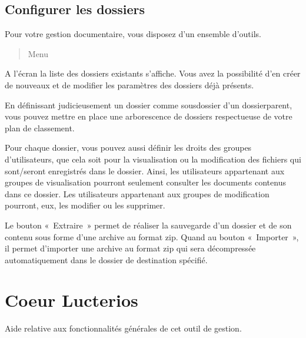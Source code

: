 \documentclass[a4paper,10pt,oneside,french]{sphinxmanual}
\begin{document}
\noindent{}

\sphinxstepscope


\section{Configurer les dossiers}
\label{\detokenize{documents/configuration:configurer-les-dossiers}}\label{\detokenize{documents/configuration::doc}}
\sphinxAtStartPar
Pour votre gestion documentaire, vous disposez d’un ensemble d’outils.
\begin{quote}

\sphinxAtStartPar
Menu 
\end{quote}

\sphinxAtStartPar
A l’écran la liste des dossiers existants s’affiche. Vous avez la possibilité d’en créer de nouveaux et de modifier les paramètres des dossiers déjà présents.

\noindent{}

\sphinxAtStartPar
En définissant judicieusement un dossier comme sous\sphinxhyphen{}dossier d’un dossier\sphinxhyphen{}parent, vous pouvez  mettre en place une arborescence de dossiers respectueuse de votre plan de classement.

\sphinxAtStartPar
Pour chaque dossier, vous pouvez aussi définir les droits des groupes d’utilisateurs, que cela soit pour la visualisation ou la modification des fichiers qui sont/seront enregistrés dans le dossier.
Ainsi, les utilisateurs appartenant aux groupes de visualisation pourront seulement consulter les documents contenus dans ce dossier. Les utilisateurs appartenant aux groupes de modification pourront, eux, les modifier ou les supprimer.

\sphinxAtStartPar
Le bouton « Extraire » permet de réaliser la sauvegarde d’un dossier et de son contenu sous forme d’une archive au format zip.
Quand au bouton « Importer », il permet d’importer une archive au format zip qui sera décompressée automatiquement dans le dossier de destination spécifié.

\sphinxstepscope


\chapter{Coeur Lucterios}
\label{\detokenize{CORE/index:coeur-lucterios}}\label{\detokenize{CORE/index::doc}}
\sphinxAtStartPar
Aide relative aux fonctionnalités générales de cet outil de gestion.
\end{document}
